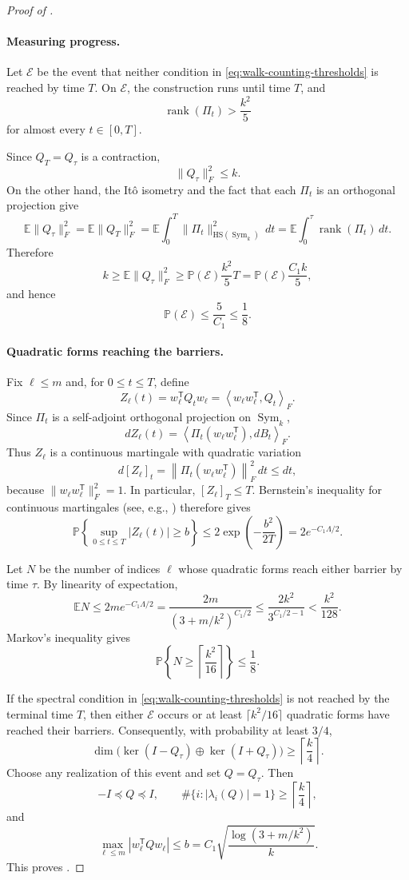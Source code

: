 \documentclass[11pt,reqno,letterpaper]{amsart}
\newcommand{\E}{\mathbb E}
\newcommand{\Prob}{\mathbb P}
\newcommand{\Sym}{\operatorname{Sym}}
\newcommand{\rank}{\operatorname{rank}}
\newcommand{\abs}[1]{\left\lvert #1\right\rvert}
\begin{document}
\begin{proof}[Proof of ]
\paragraph{\bf Measuring progress.}
Let $\mathcal E$ be the event that neither condition in
\eqref{eq:walk-counting-thresholds} is reached by time $T$. On
$\mathcal E$, the construction runs until time $T$, and
\[
 \rank(\Pi_t)>\frac{k^2}{5}
\]
for almost every $t\in[0,T]$.

Since $Q_T=Q_\tau$ is a contraction,
\[
 \|Q_\tau\|_F^2\leq k.
\]
On the other hand, the It\^o isometry and the fact that each $\Pi_t$ is
an orthogonal projection give
\[
 \E\|Q_\tau\|_F^2
 =
 \E\|Q_T\|_F^2
 =
 \E\int_0^T
 \|\Pi_t\|_{\mathrm{HS}(\Sym_k)}^2\,dt
 =
 \E\int_0^\tau\rank(\Pi_t)\,dt.
 \]
Therefore
\[
 k
 \geq
 \E\|Q_\tau\|_F^2
 \geq
 \Prob(\mathcal E)\frac{k^2}{5}T
 =
 \Prob(\mathcal E)\frac{C_1k}{5},
\]
and hence
\[
 \Prob(\mathcal E)
 \leq\frac{5}{C_1}
 \leq\frac18.
\]

\paragraph{\bf Quadratic forms reaching the barriers.}
Fix $\ell\leq m$ and, for $0\leq t\leq T$, define
\[
 Z_\ell(t)
 =
 w_\ell^{\mathsf T}Q_tw_\ell
 =
 \left\langle
 w_\ell w_\ell^{\mathsf T},Q_t
 \right\rangle_F.
\]
Since $\Pi_t$ is a self-adjoint orthogonal projection on $\Sym_k$,
\[
 dZ_\ell(t)
 =
 \left\langle
 \Pi_t(w_\ell w_\ell^{\mathsf T}),dB_t
 \right\rangle_F.
\]
Thus $Z_\ell$ is a continuous martingale with quadratic variation
\[
 d[Z_\ell]_t
 =
 \left\|
 \Pi_t(w_\ell w_\ell^{\mathsf T})
 \right\|_F^2\,dt
 \leq dt,
\]
because $\|w_\ell w_\ell^{\mathsf T}\|_F^2=1$. In particular,
$[Z_\ell]_T\leq T$. Bernstein's inequality for continuous martingales
(see, e.g., \cite[Chapter~IV, Exercise~3.16]{RY}) therefore gives
\[
 \Prob\left\{
 \sup_{0\leq t\leq T}\abs{Z_\ell(t)}\geq b
 \right\}
 \leq
 2\exp\left(-\frac{b^2}{2T}\right)
 =
 2e^{-C_1\Lambda/2}.
\]

Let $N$ be the number of indices $\ell$ whose quadratic forms reach
either barrier by time $\tau$. By linearity of expectation,
\[
 \E N
 \leq
 2me^{-C_1\Lambda/2}
 =
 \frac{2m}{(3+m/k^2)^{C_1/2}}
 \leq
 \frac{2k^2}{3^{C_1/2-1}}
 <
 \frac{k^2}{128}.
 \]
Markov's inequality gives
\[
 \Prob\left\{
 N\geq\left\lceil\frac{k^2}{16}\right\rceil
 \right\}
 \leq\frac18.
\]

If the spectral condition in
\eqref{eq:walk-counting-thresholds} is not reached by the terminal time $T$,
then either $\mathcal E$ occurs or at least
$\lceil k^2/16\rceil$ quadratic forms have reached their barriers.
Consequently, with probability at least $3/4$,
\[
 \dim\bigl(\ker(I-Q_\tau)\oplus\ker(I+Q_\tau)\bigr)
 \geq\left\lceil\frac{k}{4}\right\rceil.
\]
Choose any realization of this event and set $Q=Q_\tau$. Then
\[
 -I\preceq Q\preceq I,
 \qquad
 \#\{i:\abs{\lambda_i(Q)}=1\}
 \geq\left\lceil\frac{k}{4}\right\rceil,
\]
and
\[
 \max_{\ell\leq m}
 \abs{w_\ell^{\mathsf T}Qw_\ell}
 \leq
 b
 =
 C_1\sqrt{\frac{\log(3+m/k^2)}{k}}.
\]
This proves .
\end{proof}












\end{document}

